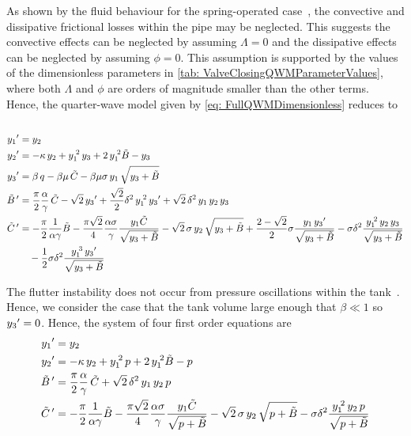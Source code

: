 As shown by the fluid behaviour for the spring-operated case~\cite{Hos2015ModelPipe}, the convective and dissipative frictional losses within the pipe may be neglected. This suggests the convective effects can be neglected by assuming $\Lambda = 0$ and the dissipative effects can be neglected by assuming $\phi = 0$. This assumption is supported by the values of the dimensionless parameters in \cref{tab: ValveClosingQWMParameterValues}, where both $\Lambda$ and $\phi$ are orders of magnitude smaller than the other terms. Hence, the quarter-wave model given by \cref{eq: FullQWMDimensionless} reduces to
~
\begin{equation*}
\begin{split}
    \dash{y_1} &= y_2 \\
    \dash{y_2} &= - \kappa \, y_2 + y_1\power{2} \, y_3 + 2 \, y_1\power{2} \tilde{B} - y_3 \\
    \dash{y_3} &= \beta \, q - \beta \mu \, \tilde{C} - \beta \mu \sigma \, y_1 \, \sqrt{y_3 + \tilde{B}} \\
    \dash{\tilde{B}\,} &= \frac{\pi}{2} \frac{\alpha}{\gamma} \, \tilde{C} - \sqrt{2} \, \dash{y_3} + \frac{\sqrt{2}}{2} \delta^2 \, y_1\power{2} \, \dash{y_3} + \sqrt{2} \, \delta^2 \, y_1 \, y_2 \, y_3 \\
    \dash{\tilde{C}\,} &=
    - \frac{\pi}{2} \frac{1}{\alpha \gamma} \tilde{B}
    - \frac{\pi \sqrt{2}}{4} \frac{\alpha \sigma}{\gamma} \frac{y_1 \tilde{C}}{\sqrt{y_3 + \tilde{B}}}
    - \sqrt{2} \, \sigma \, y_2 \, \sqrt{y_3 + \tilde{B}}
    + \frac{2-\sqrt{2}}{2} \sigma \frac{y_1 \, \dash{y_3}}{\sqrt{y_3 + \tilde{B}}}
    - \sigma \delta^2 \frac{y_1\power{2} \, y_2 \, y_3}{\sqrt{y_3 + \tilde{B}}}
    \\ & \quad %
    - \frac{1}{2} \sigma \delta^2 \frac{y_1\power{3} \, \dash{y_3}}{\sqrt{y_3 + \tilde{B}}} 
\end{split}
\end{equation*}

The flutter instability does not occur from pressure oscillations within the tank~\cite{Allison2015TestingValves}. Hence, we consider the case that the tank volume large enough that $\beta \ll 1$ so $y_3{'} = 0$. Hence, the system of four first order equations are
~
\begin{equation*}
\begin{split}
    y_1{'} &= y_2 \\
    y_2{'} &= - \kappa \, y_2 + y_1^{\;2} \, p + 2 \, y_1^{\;2} \tilde{B} - p \\
    \tilde{B}\,{'} &= \frac{\pi}{2} \frac{\alpha}{\gamma} \, \tilde{C} + \sqrt{2} \, \delta^2 \, y_1 \, y_2 \, p \\
    \tilde{C}\,{'} &=
    - \frac{\pi}{2} \frac{1}{\alpha \gamma} \tilde{B}
    - \frac{\pi \sqrt{2}}{4} \frac{\alpha \sigma}{\gamma} \frac{y_1 \tilde{C}}{\sqrt{p + \tilde{B}}}
    - \sqrt{2} \, \sigma \, y_2 \, \sqrt{p + \tilde{B}}
    - \sigma \delta^2 \frac{y_1^{\;2} \, y_2 \, p}{\sqrt{p + \tilde{B}}}
\end{split}
\end{equation*}


